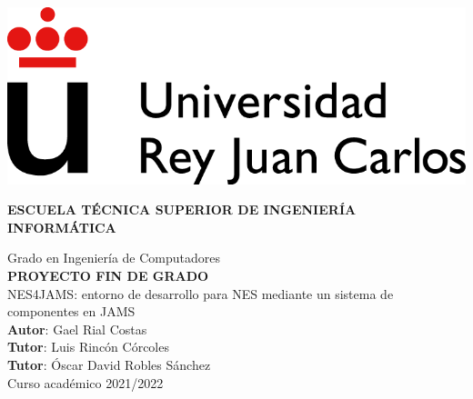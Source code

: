\thispagestyle{empty}

\includegraphics{images/URJC_logo}
\vspace{2cm}

\begin{center}
	\large{\textbf{ESCUELA TÉCNICA SUPERIOR DE INGENIERÍA INFORMÁTICA}}
	\vspace{5mm}

 	{\Large {Grado en Ingeniería de Computadores}}
    \\
  	\vspace{34mm}
	{\large {\bf PROYECTO FIN DE GRADO}}
  	\vspace{10mm}
    \\
  	{\Large {{\Huge {
		NES4JAMS: entorno de desarrollo para NES mediante un sistema de componentes en JAMS
	}} \\[1cm] }}
  	\vspace{2cm}
	{\large {
        \textbf{Autor}: Gael Rial Costas\\
        \textbf{Tutor}: Luis Rincón Córcoles\\
        \textbf{Tutor}: Óscar David Robles Sánchez\\
  	}}
	\vspace{10mm}
  	{\large {Curso académico 2021/2022}}
  	\vspace{1cm}
\end{center}